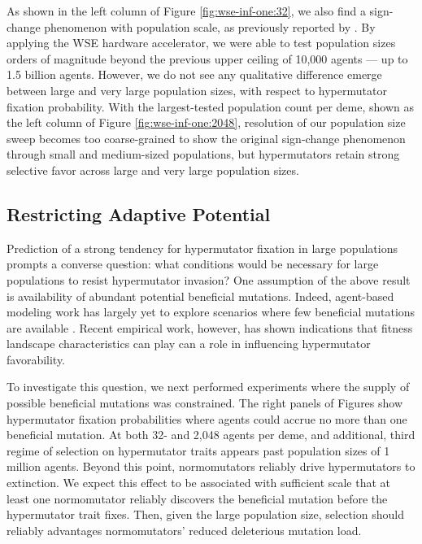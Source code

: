 As shown in the left column of Figure \ref{fig:wse-inf-one:32}, we also find a sign-change phenomenon with population scale, as previously reported by \citet{raynes2018sign}.
By applying the WSE hardware accelerator, we were able to test population sizes orders of magnitude beyond the previous upper ceiling of 10,000 agents --- up to 1.5 billion agents.
However, we do not see any qualitative difference emerge between large and very large population sizes, with respect to hypermutator fixation probability.
With the largest-tested population count per deme, shown as the left column of Figure \ref{fig:wse-inf-one:2048}, resolution of our population size sweep becomes too coarse-grained to show the original sign-change phenomenon through small and medium-sized populations, but hypermutators retain strong selective favor across large and very large population sizes.

\subsection{Restricting Adaptive Potential}
\label{sec:restricting-adaptive-potential}

Prediction of a strong tendency for hypermutator fixation in large populations prompts a converse question: what conditions would be necessary for large populations to resist hypermutator invasion?
One assumption of the above result is availability of abundant potential beneficial mutations.
Indeed, agent-based modeling work has largely yet to explore scenarios where few beneficial mutations are available \citep{raynes2013effect,raynes2018sign,raynes2019selection,raynes2019migration}.
Recent empirical work, however, has shown indications that fitness landscape characteristics can play can a role in influencing hypermutator favorability.

To investigate this question, we next performed experiments where the supply of possible beneficial mutations was constrained.
The right panels of Figures  show hypermutator fixation probabilities where agents could accrue no more than one beneficial mutation.
At both 32- and 2,048 agents per deme, and additional, third regime of selection on hypermutator traits appears past population sizes of 1 million agents.
Beyond this point, normomutators reliably drive hypermutators to extinction.
We expect this effect to be associated with sufficient scale that at least one normomutator reliably discovers the beneficial mutation before the hypermutator trait fixes.
Then, given the large population size, selection should reliably advantages normomutators' reduced deleterious mutation load.


